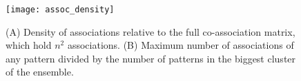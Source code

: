 
\begin{figure}[hbt!]
    \centering
    \texttt{[image: assoc\_density]}
    \caption{(A) Density of associations relative to the full co-association matrix, which hold $n^2$ associations. (B) Maximum number of associations of any pattern divided by the number of patterns in the biggest cluster of the ensemble.}
    \label{fig:eac assoc density}
\end{figure}

